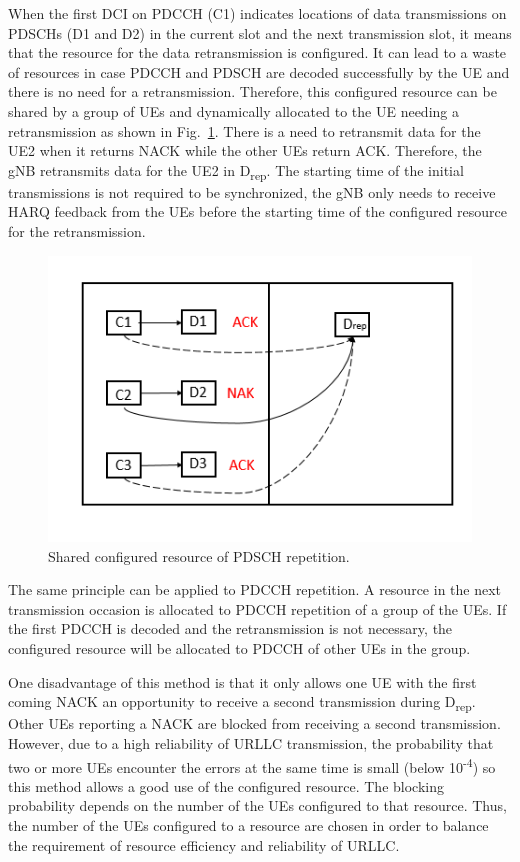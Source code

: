 \documentclass[conference]{IEEEtran}
\begin{document}
When the first DCI on PDCCH (C1) indicates locations of data transmissions on PDSCHs (D1 and D2) in the current slot and the next transmission slot, it means that the resource for the data retransmission is configured. It can lead to a waste of resources in case PDCCH and PDSCH are decoded successfully by the UE and there is no need for a retransmission. Therefore, this configured resource can be shared by a group of UEs and dynamically allocated to the UE needing a retransmission as shown in Fig.~\ref{fig2}. There is a need to retransmit data for the UE2 when it returns NACK while the other UEs return ACK. Therefore, the gNB retransmits data for the UE2 in D\textsubscript{rep}. The starting time of the initial transmissions is not required to be synchronized, the gNB only needs to receive HARQ feedback from the UEs before the starting time of the configured resource for the retransmission.

\begin{figure}[htbp]
\centerline{\includegraphics[scale=0.45]{fig2.png}}
\caption{Shared configured resource of PDSCH repetition.}
\label{fig2}
\end{figure}

The same principle can be applied to PDCCH repetition. A resource in the next transmission occasion is allocated to PDCCH repetition of a group of the UEs. If the first PDCCH is decoded and the retransmission is not necessary, the configured resource will be allocated to PDCCH of other UEs in the group.

One disadvantage of this method is that it only allows one UE with the first coming NACK an opportunity to receive a second transmission during D\textsubscript{rep}. Other UEs reporting a NACK are blocked from receiving a second transmission. However, due to a high reliability of URLLC transmission, the probability that two or more UEs encounter the errors at the same time is small (below 10\textsuperscript{-4}) so this method allows a good use of the configured resource. The blocking probability depends on the number of the UEs configured to that resource. Thus, the number of the UEs configured to a resource are chosen in order to balance the requirement of resource efficiency and reliability of URLLC.
\end{document}
